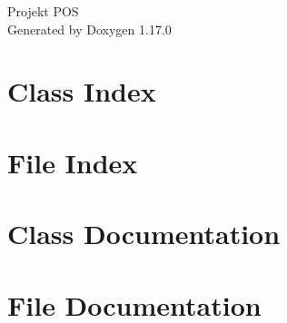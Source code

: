 \documentclass[twoside]{book}
\newcommand{\+}{\discretionary{\mbox{\scriptsize$\hookleftarrow$}}{}{}}
\newcommand{\clearemptydoublepage}{%
    \newpage{\pagestyle{empty}\cleardoublepage}%
  }
\begin{document}
  \raggedbottom
    \hypersetup{pageanchor=false,
                bookmarksnumbered=true,
                pdfencoding=unicode
               }
  \begin{titlepage}
  \vspace*{7cm}
  \begin{center}%
  {\Large Projekt POS}\\
  \vspace*{1cm}
  {\large Generated by Doxygen 1.17.0}\\
  \end{center}
  \end{titlepage}
  \clearemptydoublepage
  \tableofcontents
  \clearemptydoublepage
  \hypersetup{pageanchor=true}
\chapter{Class Index}

\chapter{File Index}

\chapter{Class Documentation}





\chapter{File Documentation}








  \backmatter
  \newpage
  \clearemptydoublepage
  \printindex
\end{document}
